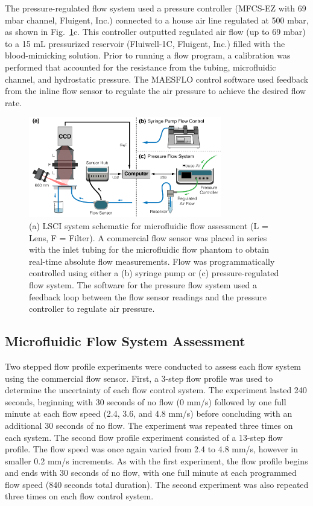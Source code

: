 \documentclass[12pt]{spieman}
\begin{document}
\begin{spacing}{2}
The pressure-regulated flow system used a pressure controller (MFCS-EZ with 69 mbar channel, Fluigent, Inc.) connected to a house air line regulated at 500 mbar, as shown in Fig.~\ref{fig:system_lsci}c. This controller outputted regulated air flow (up to 69 mbar) to a 15 mL pressurized reservoir (Fluiwell-1C, Fluigent, Inc.) filled with the blood-mimicking solution. Prior to running a flow program, a calibration was performed that accounted for the resistance from the tubing, microfluidic channel, and hydrostatic pressure. The MAESFLO control software used feedback from the inline flow sensor to regulate the air pressure to achieve the desired flow rate.

\begin{figure}
    \centering
    \includegraphics[width=0.75\textwidth]{Figure2.pdf}
    \caption {
        (a) LSCI system schematic for microfluidic flow assessment (L = Lens, F = Filter). A commercial flow sensor was placed in series with the inlet tubing for the microfluidic flow phantom to obtain real-time absolute flow measurements. Flow was programmatically controlled using either a (b) syringe pump or (c) pressure-regulated flow system. The software for the pressure flow system used a feedback loop between the flow sensor readings and the pressure controller to regulate air pressure.
    }
    \label{fig:system_lsci}
\end{figure}


\subsection{Microfluidic Flow System Assessment}
\label{sect:methods_flow_assess}

Two stepped flow profile experiments were conducted to assess each flow system using the commercial flow sensor. First, a 3-step flow profile was used to determine the uncertainty of each flow control system. The experiment lasted 240 seconds, beginning with 30 seconds of no flow (0 mm/s) followed by one full minute at each flow speed (2.4, 3.6, and 4.8 mm/s) before concluding with an additional 30 seconds of no flow. The experiment was repeated three times on each system. The second flow profile experiment consisted of a 13-step flow profile. The flow speed was once again varied from 2.4 to 4.8 mm/s, however in smaller 0.2 mm/s increments. As with the first experiment, the flow profile begins and ends with 30 seconds of no flow, with one full minute at each programmed flow speed (840 seconds total duration). The second experiment was also repeated three times on each flow control system. 


\end{spacing}
\end{document}
